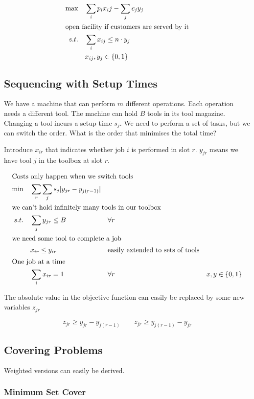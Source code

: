 \begin{align*}
\max \quad & \sum_i p_i x_ij - \sum_{j} c_j y_j\\
\intertext{open facility if customers are served by it}
s.t. \quad & \sum_{i} x_{ij} \leq n\cdot y_j\\
	& x_{ij},y_j \in \{0,1\}
\end{align*}

\subsection{Sequencing with Setup Times}

We have a machine that can perform $m$ different operations. Each operation needs a different tool. The machine can hold $B$ tools in its tool magazine. Changing a tool incurs a setup time $s_j$. We need to perform a set of tasks, but we can switch the order. What is the order that minimises the total time?

Introduce $x_{ir}$ that indicates whether job $i$ is performed in slot $r$. $y_{jr}$ means we have tool $j$ in the toolbox at slot $r$.

\begin{align*}
\intertext{Costs only happen when we switch tools}
\min \quad & \sum_r\sum_j s_j|y_{jr}-y_{j(r-1)}|\\
\intertext{we can't hold infinitely many tools in our toolbox}
s.t.\quad	& \sum_j y_{jr} \leq B && \forall r\\
\intertext{we need some tool to complete a job}
	& x_{ir} \leq y_{ir} && \text{easily extended to sets of tools}\\
\intertext{One job at a time}
	& \sum_i x_{ir} = 1 && \forall r
	& x,y\in \{0,1\}
\end{align*}

The absolute value in the objective function can easily be replaced by some new variables $z_{jr}$

\[z_{jr} \geq y_{jr} - y_{j(r-1)} \qquad z_{jr} \geq y_{j(r-1)} - y_{jr}\]

\subsection{Covering Problems}

Weighted versions can easily be derived.

\subsubsection{Minimum Set Cover}

